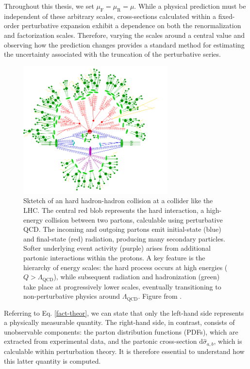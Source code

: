 \documentclass[a4paper, 12pt]{book}
\begin{document}
Throughout this thesis, we set $\mu_\text{F} = \mu_\text{R} = \mu$. While a physical prediction must be independent of these arbitrary scales, cross-sections calculated within a fixed-order perturbative expansion exhibit a dependence on both the renormalization and factorization scales. Therefore, varying the scales around a central value and observing how the prediction changes provides a standard method for estimating the uncertainty associated with the truncation of the perturbative series. \\

\begin{figure}[!ht]
	\centering
	\includegraphics[width=0.7\textwidth]{imgs/hadron-collision.png}
	\caption{Sktetch of an hard hadron-hadron collision at a collider like the LHC. The central red blob represents the hard interaction, a high-energy collision between two partons, calculable using perturbative QCD. The incoming and outgoing partons emit initial-state (blue) and final-state (red) radiation, producing many secondary particles. Softer underlying event activity (purple) arises from additional partonic interactions within the protons. A key feature is the hierarchy of energy scales: the hard process occurs at high energies ($Q>\Lambda_{\text{QCD}}$), while subsequent radiation and hadronization (green) take place at progressively lower scales, eventually transitioning to non-perturbative physics around $\Lambda_{\text{QCD}}$. Figure from \cite{Hoeche:2014}.}
	\label{hadron-collision}
\end{figure}

Referring to Eq. \ref{fact-theor}, we can state that only the left-hand side represents a physically measurable quantity. The right-hand side, in contrast, consists of unobservable components: the parton distribution functions (PDFs), which are extracted from experimental data, and the partonic cross-section $\mathrm{d}\hat{\sigma}_{a,b}$, which is calculable within perturbation theory. It is therefore essential to understand how this latter quantity is computed.
\end{document}
